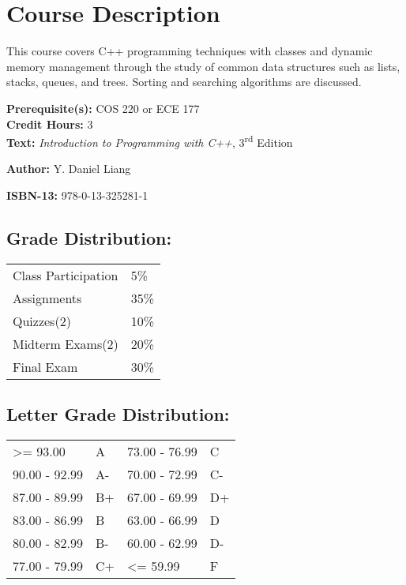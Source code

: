 \documentclass[11pt]{article}
\newcommand{\tf}[1]{%
  \large\textbf{#1}
}
\begin{document}
\section*{Course Description}
\label{sec:desc}
This course covers C++ programming techniques with classes and dynamic
memory management through the study of common data structures such as
lists, stacks, queues, and trees.  Sorting and
searching algorithms are discussed. \\

{ %
  \setlength\parindent{0pt}
  \tf{Prerequisite(s):} COS 220 or ECE 177 \\

  \tf{Credit Hours:} 3 \\

  \tf{Text:} \emph{Introduction to Programming with C++}, 3\textsuperscript{rd} Edition

  \tf{Author:} Y. Daniel Liang

  \tf{ISBN-13:} 978-0-13-325281-1
} %

\subsection*{Grade Distribution:}
\label{sec:grades}

\begin{center}
  \begin{tabular}{ l l }
    Class Participation & 5\% \\
    Assignments & 35\% \\
    Quizzes(2)  & 10\% \\
    Midterm Exams(2)  & 20\% \\
    Final Exam  & 30\%
  \end{tabular}
\end{center}

\subsection*{Letter Grade Distribution:}
\label{sec:lettergrades}

\begin{center}
  \begin{tabular}{ l l | l l }
    \textgreater= 93.00 & A & 73.00 - 76.99 & C \\
    90.00 - 92.99 & A-  & 70.00 - 72.99 & C- \\
    87.00 - 89.99 & B+  & 67.00 - 69.99 & D+ \\
    83.00 - 86.99 & B  & 63.00 - 66.99 & D \\
    80.00 - 82.99 & B-  & 60.00 - 62.99 & D- \\
    77.00 - 79.99 & C+  & \textless= 59.99 & F
  \end{tabular}  
\end{center}
\end{document}
